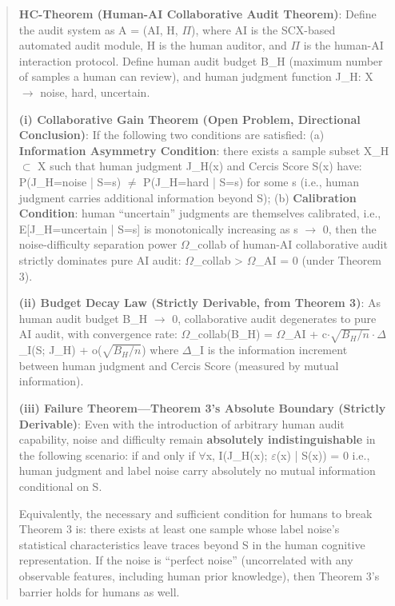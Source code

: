\documentclass[
  12pt,
]{article}
\begin{document}
\begin{quote}
\textbf{HC-Theorem (Human-AI Collaborative Audit Theorem)}: Define the audit system as A = (AI, H, $\Pi$), where AI is the SCX-based automated audit module, H is the human auditor, and $\Pi$ is the human-AI interaction protocol. Define human audit budget B\_H (maximum number of samples a human can review), and human judgment function J\_H: X $\to$ {noise, hard, uncertain}.

\textbf{(i) Collaborative Gain Theorem (Open Problem, Directional Conclusion)}: If the following two conditions are satisfied: (a) \textbf{Information Asymmetry Condition}: there exists a sample subset X\_H $\subset$ X such that human judgment J\_H(x) and Cercis Score S(x) have: P(J\_H=noise | S=s) $\neq$ P(J\_H=hard | S=s) for some s (i.e., human judgment carries additional information beyond S); (b) \textbf{Calibration Condition}: human ``uncertain'' judgments are themselves calibrated, i.e., E[J\_H=uncertain | S=s] is monotonically increasing as s $\to$ 0, then the noise-difficulty separation power $\Omega$\_collab of human-AI collaborative audit strictly dominates pure AI audit: $\Omega$\_collab > $\Omega$\_AI = 0 (under Theorem 3).

\textbf{(ii) Budget Decay Law (Strictly Derivable, from Theorem 3)}: As human audit budget B\_H $\to$ 0, collaborative audit degenerates to pure AI audit, with convergence rate: $\Omega$\_collab(B\_H) = $\Omega$\_AI + c$\cdot\sqrt{B_H/n}\cdot\Delta$\_I(S; J\_H) + o($\sqrt{B_H/n}$) where $\Delta$\_I is the information increment between human judgment and Cercis Score (measured by mutual information).

\textbf{(iii) Failure Theorem---Theorem 3's Absolute Boundary (Strictly Derivable)}: Even with the introduction of arbitrary human audit capability, noise and difficulty remain \textbf{absolutely indistinguishable} in the following scenario: if and only if $\forall$x, I(J\_H(x); $\varepsilon$(x) | S(x)) = 0 i.e., human judgment and label noise carry absolutely no mutual information conditional on S.

Equivalently, the necessary and sufficient condition for humans to break Theorem 3 is: there exists at least one sample whose label noise's statistical characteristics leave traces beyond S in the human cognitive representation. If the noise is ``perfect noise'' (uncorrelated with any observable features, including human prior knowledge), then Theorem 3's barrier holds for humans as well.
\end{quote}
\end{document}
